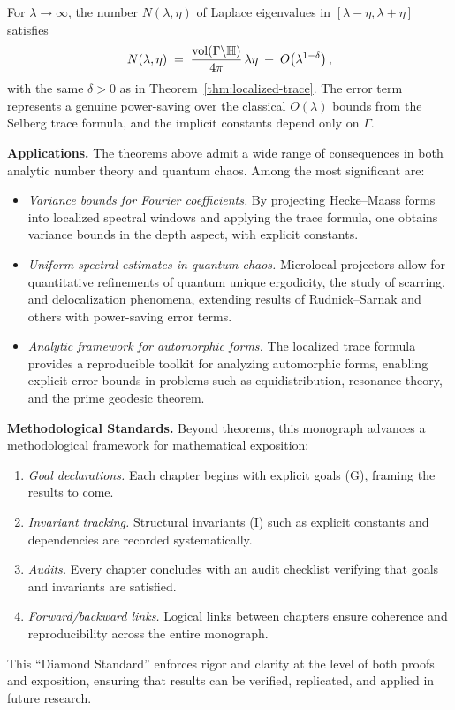 \begin{theorem}\label{thm:local-weyl}
For $\lambda \to \infty$, the number $N(\lambda,\eta)$ of Laplace eigenvalues
in $[\lambda-\eta,\lambda+\eta]$ satisfies
\[
  N(\lambda,\eta)
  \;=\; \frac{\operatorname{vol}(\Gamma \backslash \mathbb{H})}{4\pi}\,\lambda \eta
  \;+\; O\!\left(\lambda^{1-\delta}\right),
\]
with the same $\delta>0$ as in Theorem~\ref{thm:localized-trace}. The error
term represents a genuine power-saving over the classical $O(\lambda)$ bounds
from the Selberg trace formula, and the implicit constants depend only on
$\Gamma$.
\end{theorem}

\medskip
\noindent\textbf{Applications.}
The theorems above admit a wide range of consequences in both analytic number
theory and quantum chaos. Among the most significant are:
\begin{itemize}
  \item \emph{Variance bounds for Fourier coefficients.}  
  By projecting Hecke–Maass forms into localized spectral windows and applying
  the trace formula, one obtains variance bounds in the depth aspect, with
  explicit constants.
  \item \emph{Uniform spectral estimates in quantum chaos.}  
  Microlocal projectors allow for quantitative refinements of quantum unique
  ergodicity, the study of scarring, and delocalization phenomena, extending
  results of Rudnick–Sarnak and others with power-saving error terms.
  \item \emph{Analytic framework for automorphic forms.}  
  The localized trace formula provides a reproducible toolkit for analyzing
  automorphic forms, enabling explicit error bounds in problems such as
  equidistribution, resonance theory, and the prime geodesic theorem.
\end{itemize}

\medskip
\noindent\textbf{Methodological Standards.}
Beyond theorems, this monograph advances a methodological framework for
mathematical exposition:
\begin{enumerate}
  \item \emph{Goal declarations.}  
  Each chapter begins with explicit goals (G), framing the results to come.
  \item \emph{Invariant tracking.}  
  Structural invariants (I) such as explicit constants and dependencies are
  recorded systematically.
  \item \emph{Audits.}  
  Every chapter concludes with an audit checklist verifying that goals and
  invariants are satisfied.
  \item \emph{Forward/backward links.}  
  Logical links between chapters ensure coherence and reproducibility across
  the entire monograph.
\end{enumerate}
This ``Diamond Standard'' enforces rigor and clarity at the level of both
proofs and exposition, ensuring that results can be verified, replicated, and
applied in future research.

